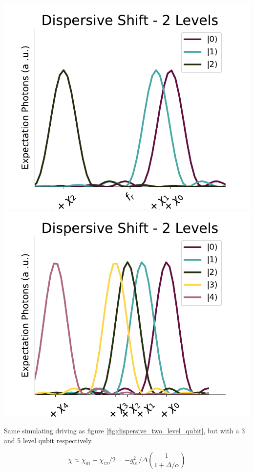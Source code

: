 \begin{marginfigure}
    \centering
    \includegraphics[]{Simulations/readout_simulations/dispersive_shift_3_level.pdf}
    \includegraphics[]{Simulations/readout_simulations/dispersive_shift_5_level.pdf}
    \caption{Same simulating driving as figure \ref{fig:dispersive_two_level_qubit}, but with a 3 and 5 level qubit respectively.}
    \label{fig:dispersive_multi_level}
\end{marginfigure}
\begin{equation}\label{eq:chi}
    \chi \approx \chi_{01} + \chi_{12}/2 = - g_{01}^2/\Delta \left(\frac{1}{1 + \Delta / \alpha}\right)
\end{equation}
